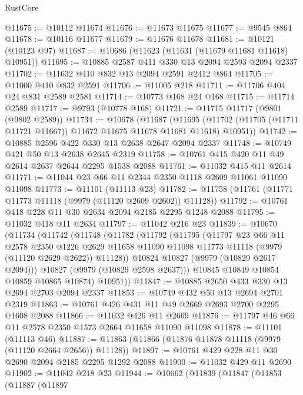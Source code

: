 \begin{lexlean}{RustCore}
\begin{coremodule}
@11675 := @10112 @11674
@11676 := @11673 @11675
@11677 := @9545 @864
@11678 := @10116 @11677
@11679 := @11676 @11678
@11681 := @10121 (@10123 @97)
@11687 := @10686 (@11623 (@11631 (@11679 @11681 @11618) @10951))
@11695 := @10885 @2587 @411 @330 @13 @2094 @2593 @2094 @2337
@11702 := @11632 @410 @832 @13 @2094 @2591 @2412 @864
@11705 := @11000 @410 @832 @2591
@11706 := @11005 @218
@11711 := @11706 @404 @24 @831 @2589 @2581
@11714 := @10773 @168 @24 @168
@11715 := @11714 @2589
@11717 := @9793 (@10778 @168)
@11721 := @11715 @11717 (@9801 (@9802 @2589))
@11734 := @10678
    (@11687
      (@11695 (@11702 (@11705 (@11711 @11721 @11667)) @11672 @11675 @11678 @11681 @11618) @10951))
@11742 := @10885 @2596 @422 @330 @13 @2638 @2647 @2094 @2337
@11748 := @10749 @421 @50 @13 @2638 @2645 @2319
@11758 := @10761 @415 @420 @11 @49 @2614 @2637 @2644 @2295 @1538 @2088
@11761 := @11032 @415 @11 @2614
@11771 := @11044 @23 @66 @11 @2344 @2350 @1118 @2609 @11061 @11090 @11098
@11773 := @11101 (@11113 @23)
@11782 := @11758 (@11761 (@11771 @11773 @11118 (@9979 (@11120 @2609 @2602)) @11128))
@11792 := @10761 @418 @228 @11 @30 @2634 @2094 @2185 @2295 @1248 @2088
@11795 := @11032 @418 @11 @2634
@11797 := @11042 @216 @23
@11839 := @10670
    (@11734
      (@11742
        (@11748
          (@11782
            (@11792
              (@11795
                (@11797
                  @23
                  @66
                  @11
                  @2578
                  @2350
                  @1226
                  @2629
                  @11658
                  @11090
                  @11098
                  @11773
                  @11118
                  (@9979 (@11120 @2629 @2622))
                  @11128))
              @10824
              @10827
              (@9979 (@10829 @2617 @2094)))
            @10827
            (@9979 (@10829 @2598 @2637)))
          @10845
          @10849
          @10854
          @10859
          @10865
          @10874)
        @10951))
@11847 := @10885 @2650 @433 @330 @13 @2694 @2703 @2094 @2337
@11853 := @10749 @432 @50 @13 @2694 @2701 @2319
@11863 := @10761 @426 @431 @11 @49 @2669 @2693 @2700 @2295 @1608 @2088
@11866 := @11032 @426 @11 @2669
@11876 := @11797 @46 @66 @11 @2578 @2350 @1573 @2664 @11658 @11090 @11098
@11878 := @11101 (@11113 @46)
@11887 := @11863 (@11866 (@11876 @11878 @11118 (@9979 (@11120 @2664 @2656)) @11128))
@11897 := @10761 @429 @228 @11 @30 @2690 @2094 @2185 @2295 @1292 @2088
@11900 := @11032 @429 @11 @2690
@11902 := @11042 @218 @23
@11944 := @10662
    (@11839
      (@11847
        (@11853
          (@11887
            (@11897

\end{coremodule}
\end{lexlean}
